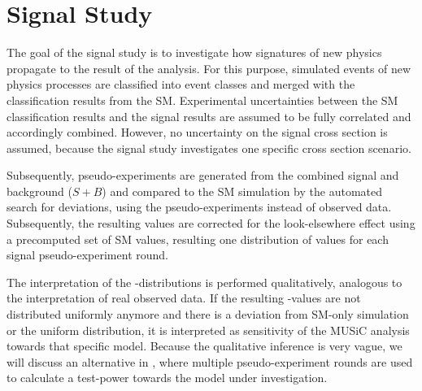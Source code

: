 
%


\section{Signal Study}
The goal of the signal study is to investigate how signatures of new physics propagate to the result of the analysis. For this purpose, simulated events of new physics processes are classified into event classes and merged with the classification results from the \acl{SM}. Experimental uncertainties between the \ac{SM} classification results and the signal results are assumed to be fully correlated and accordingly combined. However, no uncertainty on the signal cross section is assumed, because the signal study investigates one specific cross section scenario.

Subsequently, pseudo-experiments are generated from the combined signal and background ($S+B$) and compared to the \ac{SM} simulation by the automated search for deviations, using the pseudo-experiments instead of observed data. Subsequently, the resulting \TSmin values are corrected for the look-elsewhere effect using a precomputed set of \ac{SM} \TS values, resulting one distribution of \ptilde values for each signal pseudo-experiment round.

The interpretation of the \ptilde-distributions is performed qualitatively, analogous to the interpretation of real observed data. If the resulting \ptilde-values are not distributed uniformly anymore and there is a deviation from \ac{SM}-only simulation or the uniform distribution, it is interpreted as sensitivity of the \ac{MUSiC} analysis towards that specific model.
Because the qualitative inference is very vague, we will discuss an alternative in , where multiple pseudo-experiment rounds are used to calculate a test-power towards the model under investigation.

